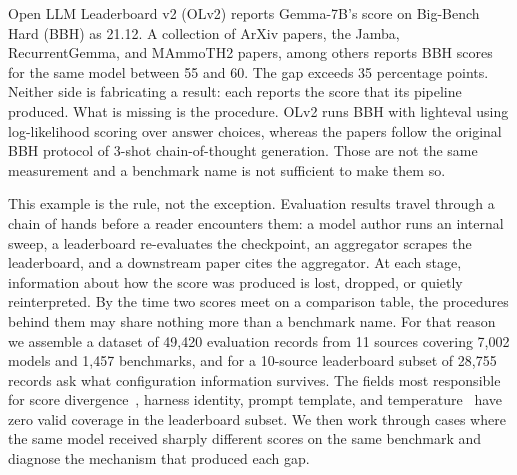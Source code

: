 \documentclass[11pt]{article}
\begin{document}
%

Open LLM Leaderboard v2 (OLv2) reports Gemma-7B's score on Big-Bench
Hard (BBH) as 21.12. A collection of ArXiv papers, the Jamba, RecurrentGemma,
and MAmmoTH2 papers, among others reports BBH scores for the same model
between 55 and 60. The gap exceeds 35 percentage points. Neither side is
fabricating a result: each reports the score that its pipeline produced.
What is missing is the procedure. OLv2 runs BBH with lighteval using
log-likelihood scoring over answer choices, whereas the papers follow the original
BBH protocol of 3-shot chain-of-thought generation. Those are not the same
measurement and a benchmark name is not sufficient to make them so.

This example is the rule, not the exception. Evaluation results travel
through a chain of hands before a reader encounters them: a model author runs
an internal sweep, a leaderboard re-evaluates the checkpoint, an aggregator
scrapes the leaderboard, and a downstream paper cites the aggregator. At
each stage, information about how the score was produced is lost, dropped,
or quietly reinterpreted. By the time two scores meet on a comparison table,
the procedures behind them may share nothing more than a benchmark name.
For that reason we assemble a dataset of 49{,}420 evaluation records from
11 sources covering 7{,}002 models and 1{,}457 benchmarks, and for a
10-source leaderboard subset of 28{,}755 records ask what configuration
information survives. The fields most responsible for score divergence~,
harness identity, prompt template, and temperature~ have zero valid
coverage in the leaderboard subset. We then work through cases where the
same model received sharply different scores on the same benchmark and
diagnose the mechanism that produced each gap.
\end{document}
